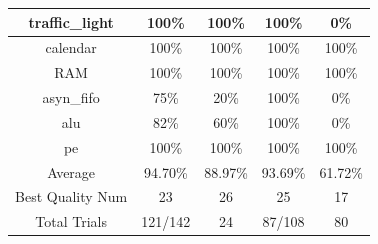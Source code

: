 \begin{tabular}{c|cc|cc}
traffic\_light & \color{black} {\cellcolor{lightblue}} 100\% & \color{black} {\cellcolor{lightgreen}} 100\% & \color{black} {\cellcolor{lightblue}} 100\% & 0\% \\ \midrule
calendar & \color{black} {\cellcolor{lightblue}} 100\% & \color{black} {\cellcolor{lightgreen}} 100\% & \color{black} {\cellcolor{lightblue}} 100\% & \color{black} {\cellcolor{lightgreen}} 100\% \\ \midrule
RAM & \color{black} {\cellcolor{lightblue}} 100\% & \color{black} {\cellcolor{lightgreen}} 100\% & \color{black} {\cellcolor{lightblue}} 100\% & \color{black} {\cellcolor{lightgreen}} 100\% \\ \midrule
asyn\_fifo & 75\% & \color{black} {\cellcolor{lightgreen}} 20\% & \color{black} {\cellcolor{lightblue}} 100\% & 0\% \\ \midrule
alu & 82\% & \color{black} {\cellcolor{lightgreen}} 60\% & \color{black} {\cellcolor{lightblue}} 100\% & 0\% \\ \midrule
pe & \color{black} {\cellcolor{lightblue}} 100\% & \color{black} {\cellcolor{lightgreen}} 100\% & \color{black} {\cellcolor{lightblue}} 100\% & \color{black} {\cellcolor{lightgreen}} 100\% \\ \midrule
Average & \color{black} {\cellcolor{lightblue}} 94.70\% & \color{black} {\cellcolor{lightgreen}} 88.97\% & 93.69\% & 61.72\% \\ \midrule
Best Quality Num & 23 & \color{black} {\cellcolor{lightgreen}} 26 & \color{black} {\cellcolor{lightblue}} 25 & 17 \\ \midrule
Total Trials & \color{black} {\cellcolor{lightblue}} 121/142 & 24 & 87/108 & \color{black} {\cellcolor{lightgreen}} 80 \\
\bottomrule
\end{tabular}
